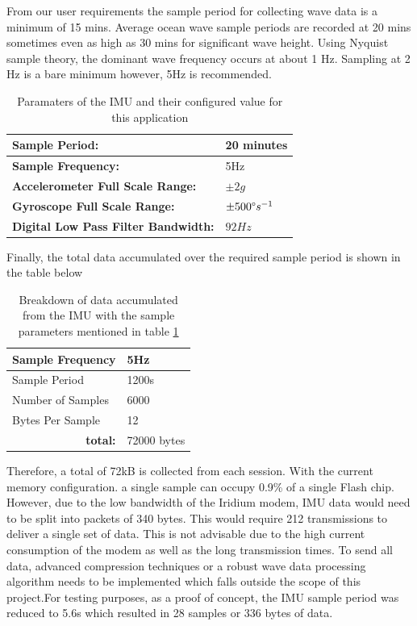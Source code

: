 From our user requirements the sample period for collecting wave data is a minimum of 15 mins. Average ocean wave sample periods are recorded at 20 mins sometimes even as high as 30 mins for significant wave height. Using Nyquist sample theory, the dominant wave frequency occurs at about 1 Hz. Sampling at 2 Hz \cite{kohout2015device} is a bare minimum however, 5Hz is recommended. 

\begin{table}[H]
    \centering
    \begin{tabular}{|l|l|}
    \hline
      \textbf{Sample Period: }   &  20 minutes\\
      \hline
      \textbf{Sample Frequency:} & 5Hz \\
      \hline
      \textbf{Accelerometer Full Scale Range:} & $\pm 2g$\\ 
      \hline
      \textbf{Gyroscope Full Scale Range:} & $\pm 500\degree s^{-1}$\\
      \hline
      \textbf{Digital Low Pass Filter Bandwidth:} & $92Hz$\\ 
      \hline
    \end{tabular}
    \caption{Paramaters of the IMU and their configured value for this application}
    \label{tab:IMU_param}
\end{table}

Finally, the total data accumulated over the required sample period is shown in the table below

\begin{table}[H]
    \centering
    \caption{Breakdown of data accumulated from the IMU with the sample parameters mentioned in table \ref{tab:IMU_param}}
    \begin{tabular}{|l|l|}
    \hline
    Sample Frequency     &  5Hz\\
    \hline
    Sample Period        & 1200s\\
    \hline
    Number of Samples    & 6000 \\ 
    \hline
    Bytes Per Sample     & 12 \\
    \hline
    \multicolumn{1}{r}{\textbf{total:}} & \multicolumn{1}{l}{72000 bytes}\\
    \end{tabular}

    \label{tab:IMU_data_total}
\end{table}

Therefore, a total of 72kB is collected from each session. With the current memory configuration. a single sample can occupy 0.9\% of a single Flash chip. However, due to the low bandwidth of the Iridium modem, IMU data would need to be split into packets of 340 bytes. This would require 212 transmissions to deliver a single set of data. This is not advisable due to the high current consumption of the modem as well as the long transmission times. To send all data, advanced compression techniques or a robust wave data processing algorithm needs to be implemented which falls outside the scope of this project.For testing purposes, as a proof of concept, the IMU sample period was reduced to 5.6s which resulted in 28 samples or 336 bytes of data.  

